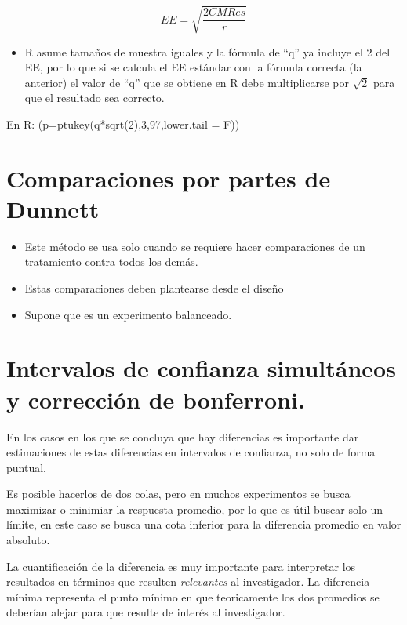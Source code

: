 \documentclass[
]{article}
\providecommand{\tightlist}{%
  \setlength{\itemsep}{0pt}\setlength{\parskip}{0pt}}
\begin{document}
\[
EE=\sqrt{\frac{2CMRes}{r}}
\]

\begin{itemize}
\tightlist
\item
  R asume tamaños de muestra iguales y la fórmula de ``q'' ya incluye el
  2 del EE, por lo que si se calcula el EE estándar con la fórmula
  correcta (la anterior) el valor de ``q'' que se obtiene en R debe
  multiplicarse por \(\sqrt 2\) para que el resultado sea correcto.
\end{itemize}

En R: (p=ptukey(q*sqrt(2),3,97,lower.tail = F))

\section{Comparaciones por partes de
Dunnett}\label{comparaciones-por-partes-de-dunnett}

\begin{itemize}
\item
  Este método se usa solo cuando se requiere hacer comparaciones de un
  tratamiento contra todos los demás.
\item
  Estas comparaciones deben plantearse desde el diseño
\item
  Supone que es un experimento balanceado.
\end{itemize}

\section{Intervalos de confianza simultáneos y corrección de
bonferroni.}\label{intervalos-de-confianza-simultuxe1neos-y-correcciuxf3n-de-bonferroni.}

En los casos en los que se concluya que hay diferencias es importante
dar estimaciones de estas diferencias en intervalos de confianza, no
solo de forma puntual.

Es posible hacerlos de dos colas, pero en muchos experimentos se busca
maximizar o minimiar la respuesta promedio, por lo que es útil buscar
solo un límite, en este caso se busca una cota inferior para la
diferencia promedio en valor absoluto.

La cuantificación de la diferencia es muy importante para interpretar
los resultados en términos que resulten \emph{relevantes} al
investigador. La diferencia mínima representa el punto mínimo en que
teoricamente los dos promedios se deberían alejar para que resulte de
interés al investigador.
\end{document}
